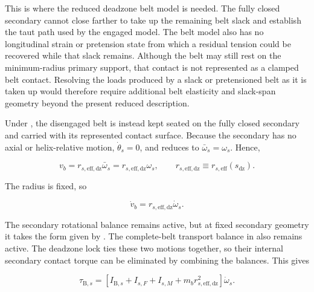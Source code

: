 \documentclass[11pt]{report}
\numberwithin{equation}{section}
\newcounter{assump}
\begin{document}
This is where the reduced deadzone belt model is needed. The fully closed
secondary cannot close farther to take up the remaining belt slack and
establish the taut path used by the engaged model. The belt model also has no
longitudinal strain or pretension state from which a residual tension could be
recovered while that slack remains. Although the belt may still rest on the
minimum-radius primary support, that contact is not represented as a clamped
belt contact. Resolving the loads produced by a slack or pretensioned belt as
it is taken up would therefore require additional belt elasticity and
slack-span geometry beyond the present reduced description.

Under , the disengaged belt is instead
kept seated on the fully closed secondary and carried with its represented
contact surface. Because the secondary has no axial or helix-relative motion,
\(\dot\theta_s=0\), and
 reduces to
\(\bar\omega_s=\omega_s\). Hence,

\begin{equation}
    v_b
    =
    r_{s,\mathrm{eff,dz}}\bar\omega_s
    =
    r_{s,\mathrm{eff,dz}}\omega_s,
    \qquad
    r_{s,\mathrm{eff,dz}}
    \equiv
    r_{s,\mathrm{eff}}(s_{\mathrm{dz}}).
    \label{eq:deadzone_secondary_lock}
\end{equation}

The radius is fixed, so

\begin{equation}
    \dot v_b
    =
    r_{s,\mathrm{eff,dz}}\dot\omega_s.
    \label{eq:deadzone_belt_acceleration_lock}
\end{equation}

The secondary rotational balance remains active, but at fixed secondary
geometry it takes the form given by
. The complete-belt
transport balance in  also remains
active. The deadzone lock ties these two motions together, so their internal
secondary contact torque can be eliminated by combining the balances. This
gives

\begin{equation}
    \tau_{\mathrm B,s}
    =
    \left[
        I_{\mathrm B,s}
        +
        I_{s,F}
        +
        I_{s,M}
        +
        m_b r_{s,\mathrm{eff,dz}}^2
    \right]\dot\omega_s.
    \label{eq:deadzone_secondary_rotation}
\end{equation}
\end{document}
